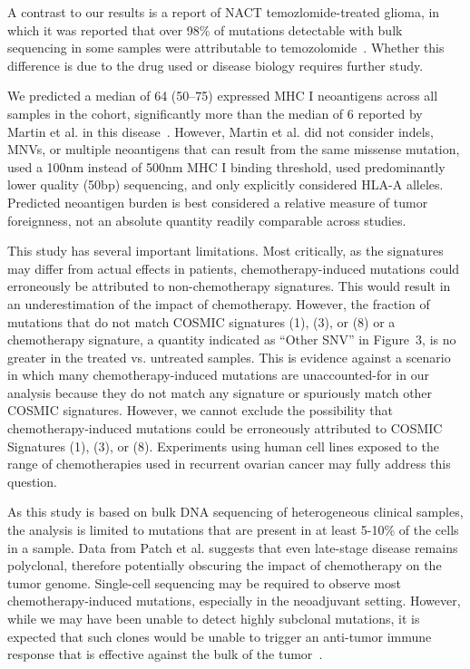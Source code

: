 \documentclass{bmcart}
\begin{document}


A contrast to our results is a report of NACT temozlomide-treated glioma, in which it was reported that over 98\% of mutations detectable with bulk sequencing in some samples were attributable to temozolomide~\cite{Johnson_2013}. Whether this difference is due to the drug used or disease biology requires further study.

We predicted a median of 64 (50--75) expressed MHC I neoantigens across all samples in the cohort, significantly more than the median of 6 reported by Martin et al. in this disease~\cite{Martin_2016}. However, Martin et al. did not consider indels, MNVs, or multiple neoantigens that can result from the same missense mutation, used a 100nm instead of 500nm MHC I binding threshold, used predominantly lower quality (50bp) sequencing, and only explicitly considered HLA-A alleles. Predicted neoantigen burden is best considered a relative measure of tumor foreignness, not an absolute quantity readily comparable across studies.

This study has several important limitations. Most critically, as the signatures may differ from actual effects in patients, chemotherapy-induced mutations could erroneously be attributed to non-chemotherapy signatures. This would result in an underestimation of the impact of chemotherapy. However, the fraction of mutations that do not match COSMIC signatures (1), (3), or (8) or a chemotherapy signature, a quantity indicated as ``Other SNV'' in Figure~3, is no greater in the treated vs. untreated samples. This is evidence against a scenario in which many chemotherapy-induced mutations are unaccounted-for in our analysis because they do not match any signature or spuriously match other COSMIC signatures. However, we cannot exclude the possibility that chemotherapy-induced mutations could be erroneously attributed to COSMIC Signatures (1), (3), or (8). Experiments using human cell lines exposed to the range of chemotherapies used in recurrent ovarian cancer may fully address this question.

As this study is based on bulk DNA sequencing of heterogeneous clinical samples, the analysis is limited to mutations that are present in at least 5-10\% of the cells in a sample. Data from Patch et al. suggests that even late-stage disease remains polyclonal, therefore potentially obscuring the impact of chemotherapy on the tumor genome. Single-cell sequencing may be required to observe most chemotherapy-induced mutations, especially in the neoadjuvant setting. However, while we may have been unable to detect highly subclonal mutations, it is expected that such clones would be unable to trigger an anti-tumor immune response that is effective against the bulk of the tumor~\cite{McGranahan_2016}. 
\end{document}
